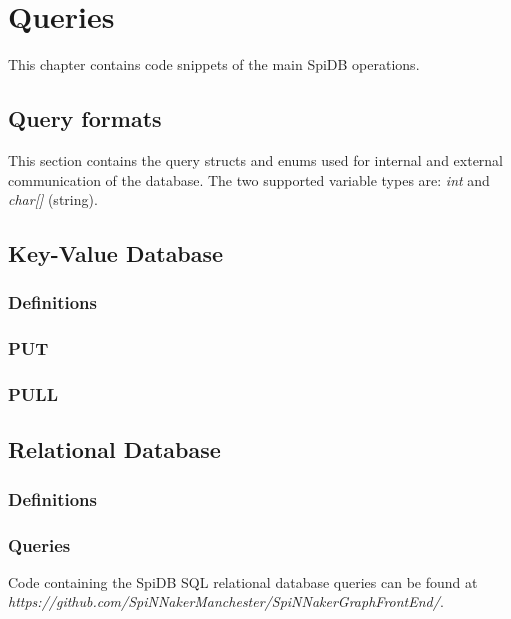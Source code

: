 \chapter{Queries}
This chapter contains code snippets of the main SpiDB operations.

\section{Query formats}
\label{sec:appendix-queries}
This section contains the query structs and enums used for internal and external communication of the database. The two supported variable types are: \textit{int} and \textit{char[]} (string).



\section{Key-Value Database}
\subsection{Definitions}


\subsection{PUT}


\subsection{PULL}


\section{Relational Database}
\subsection{Definitions}


\subsection{Queries}
Code containing the SpiDB SQL relational database queries can be found at \\
\textit{https://github.com/SpiNNakerManchester/SpiNNakerGraphFrontEnd/}.